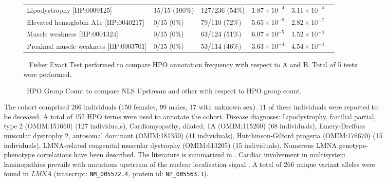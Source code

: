 \begin{figure}[htbp]
\begin{subfigure}[b]{0.95\textwidth}
{\begin{tabular}{llllrr}
\midrule
Lipodystrophy [HP:0009125] & 15/15 (100\%) & 127/236 (54\%) & $1.87\times 10^{-4}$ & $3.11\times 10^{-4}$\\
Elevated hemoglobin A1c [HP:0040217] & 0/15 (0\%) & 79/110 (72\%) & $5.65\times 10^{-8}$ & $2.82\times 10^{-7}$\\
Muscle weakness [HP:0001324] & 0/15 (0\%) & 63/124 (51\%) & $6.07\times 10^{-5}$ & $1.52\times 10^{-4}$\\
Proximal muscle weakness [HP:0003701] & 0/15 (0\%) & 53/114 (46\%) & $3.63\times 10^{-4}$ & $4.54\times 10^{-4}$\\
\bottomrule
\end{tabular}
}
\captionsetup{justification=raggedright,singlelinecheck=false}
\caption{         Fisher Exact Test performed to compare HPO annotation frequency with respect to A and B. Total of
        5 tests were performed. }
\end{subfigure}
\vspace{2em}
\begin{subfigure}[b]{0.95\textwidth}
\captionsetup{justification=raggedright,singlelinecheck=false}
\caption{ HPO Group Count to compare NLS Upstream and other with respect to HPO group count. }
\end{subfigure}

\vspace{2em}

\caption{ The cohort comprised 266 individuals (150 females, 99 males, 17 with unknown sex). 11 of these individuals were reported to be deceased. 
A total of 152 HPO terms were used to annotate the cohort. Disease diagnoses: Lipodystrophy, familial partial, type 2 (OMIM:151660) (127 individuals), 
Cardiomyopathy, dilated, 1A (OMIM:115200) (68 individuals), Emery-Dreifuss muscular dystrophy 2, autosomal dominant (OMIM:181350) (41 individuals), 
Hutchinson-Gilford progeria (OMIM:176670) (15 individuals), LMNA-related congenital muscular dystrophy (OMIM:613205) (15 individuals). 
Numerous LMNA genotype-phenotype correlations have been described. The literature is summarized in \cite{PMID_32413188}. 
Cardiac involvement in multisystem laminopathies prevails with mutations upstream of the nuclear localisation signal \cite{PMID_30402260}.
A total of 266 unique variant alleles were found in \textit{LMNA} (transcript: \texttt{NM\_005572.4}, protein id: \texttt{NP\_005563.1}).}
\end{figure}
